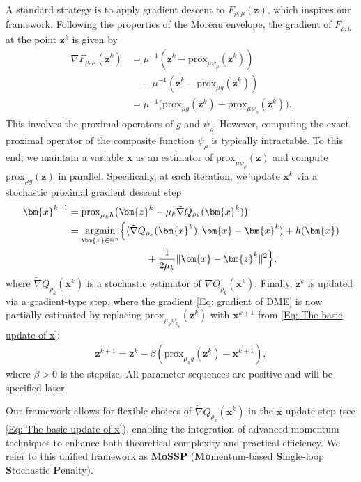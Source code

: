 \documentclass{article}
\theoremstyle{plain}
\theoremstyle{definition}
\theoremstyle{remark}
\newcommand{\RR}{\mathbb{R}}
\newcommand{\prox}{\mathrm{prox}}
\newcommand{\bx}{\bm{x}}
\newcommand{\bz}{\bm{z}}
\DeclareMathOperator*{\argmin}{\mathrm{argmin}}
\numberwithin{equation}{section}
\begin{document}
A standard strategy is to apply gradient descent to \(F_{\rho,\mu}(\bz)\), which inspires our framework. Following the properties of the Moreau envelope, the gradient of \(F_{\rho,\mu}\) at the point \(\bz^k\) is given by
\begin{equation}
\label{Eq: gradient of DME}
\begin{aligned}
\nabla F_{\rho,\mu}(\bz^k)
&= \mu^{-1} (\bz^k - \prox_{\mu \psi_\rho}(\bz^k)) \\
&\quad - \mu^{-1}(\bz^k-\prox_{\mu g}(\bz^k)) \\
&= \mu^{-1} \bigl(\prox_{\mu g}(\bz^k)
- \prox_{\mu \psi_\rho}(\bz^k)\bigr).
\end{aligned}
\end{equation}
This involves the proximal operators of \(g\) and \(\psi_\rho\). However, 
computing the exact proximal operator of the composite function $\psi_{\rho}$ is typically intractable. To this end, we maintain a variable \(\bx\) as an estimator of \(\prox_{\mu \psi_{\rho}}(\bz)\) and compute \(\prox_{\mu g}(\bz)\) in parallel. Specifically, at each iteration, we update \(\bx^k\) via a stochastic proximal gradient descent step
\begin{equation}
\label{Eq: The basic update of x}
\begin{aligned}
\bx^{k+1}
&= \prox_{\mu_k h}\bigl(\bz^k - \mu_k \tilde{\nabla} Q_{\rho_k}(\bx^k) \bigr) \\
&= \argmin_{\bx \in \RR^n} \Bigl\{
\langle \tilde{\nabla} Q_{\rho_k}(\bx^k) , \bx - \bx^{k} \rangle + h(\bx) \\
&\qquad\qquad\qquad\qquad
+ \frac{1}{2 \mu_{k}} \| \bx - \bz^{k} \|^{2}
\Bigr\},
\end{aligned}
\end{equation}
where \(\tilde{\nabla} Q_{\rho_k}(\bx^k)\) is a stochastic estimator of \(\nabla Q_{\rho_k}(\bx^k)\). Finally, \(\bz^k\) is updated via a gradient-type step, where the gradient \eqref{Eq: gradient of DME} is now partially estimated by replacing \(\prox_{\mu_k \psi_{\rho_k}}(\bz^k)\) with \(\bx^{k+1}\) from \eqref{Eq: The basic update of x}:
\begin{align} 
\label{eq:bz_update}
\bz^{k+1} = \bz^k - \beta \left( \prox_{\mu_k g}(\bz^k) - \bx^{k+1} \right),
\end{align}
where \(\beta > 0\) is the stepsize. All parameter sequences are positive and will be specified later.

Our framework allows for flexible choices of \(\tilde{\nabla} Q_{\rho_k}(\bx^k)\) in the \(\bx\)-update step (see \eqref{Eq: The basic update of x}), enabling the integration of advanced momentum techniques to enhance both theoretical complexity and practical efficiency. We refer to this unified framework as \textbf{MoSSP} (\textbf{Mo}mentum-based \textbf{S}ingle-loop \textbf{S}tochastic \textbf{P}enalty).
\end{document}
